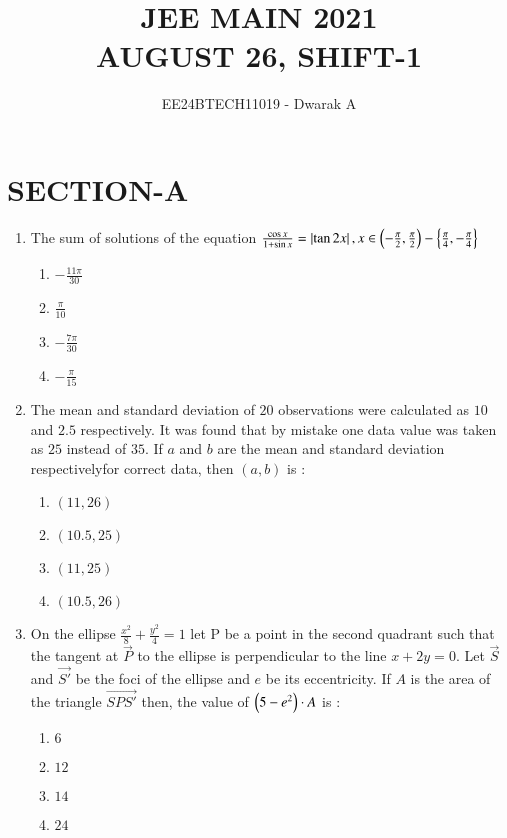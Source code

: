 \documentclass[journal,12pt,twocolumn]{IEEEtran}
\theoremstyle{remark}
\begin{document}

\vspace{3cm}

\title{\textbf{JEE MAIN 2021\\AUGUST 26, SHIFT-1}}
\author{EE24BTECH11019 - Dwarak A}
\maketitle
\newpage
\bigskip

\renewcommand{\thefigure}{\theenumi}
\renewcommand{\thetable}{\theenumi}

\section*{\textbf{SECTION-A}}
\bigskip

\begin{enumerate}
    \item The sum of solutions of the equation $\frac{\cos{x}}{1+\sin{x}}=\left\vert\tan{2x}\right\vert, x \in \left(-\frac{\pi}{2},\frac{\pi}{2}\right)-\left\{\frac{\pi}{4},-\frac{\pi}{4}\right\}$
        \begin{enumerate}
            \item $-\frac{11\pi}{30}$
            \item $\frac{\pi}{10}$
            \item $-\frac{7\pi}{30}$
            \item $-\frac{\pi}{15}$
        \end{enumerate}
    
    \item The mean and standard deviation of $20$ observations were calculated as $10$ and $2.5$ respectively. It was found that by mistake one data value was taken as $25$ instead of $35$. If $a$ and $b$ are the mean and standard deviation respectivelyfor correct data, then $(a,b)$ is : 
        \begin{enumerate}
            \item $(11,26)$
            \item $(10.5,25)$
            \item $(11,25)$
            \item $(10.5,26)$
        \end{enumerate}
    
    \item On the ellipse $\frac{x^2}{8}+\frac{y^2}{4}=1$ let P be a point in the second quadrant such that the tangent at $\vec{P}$ to the ellipse is perpendicular to the line $x+2y=0$. Let $\vec{S}$ and $\vec{S'}$ be the foci of the ellipse and $e$ be its eccentricity. If $A$ is the area of the triangle $\vec{SPS'}$ then, the value of $\left(5-e^2\right)\cdot A$ is :
        \begin{enumerate}
            \item $6$
            \item $12$
            \item $14$
            \item $24$
        \end{enumerate}


\end{enumerate}
\end{document}

